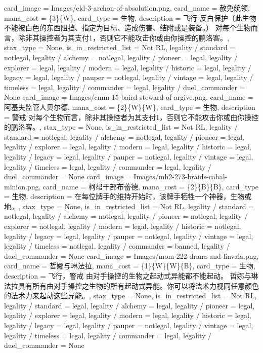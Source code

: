 \documentclass[lang = cn, color = black, 10pt]{AllThatStax}
\begin{document}
\card
{
	card_image = Images/eld-3-archon-of-absolution.png,
	card_name = 赦免统领,
	mana_cost = \{3\}\{W\},
	card_type = 生物,
	description = 飞行
	反白保护（此生物不能被白色的东西阻挡、指定为目标、造成伤害、结附或是装备。）
	对每个生物而言，除非其操控者为其支付{1}，否则它不能攻击你或由你操控的鹏洛客。,
	stax_type = None,
	is_in_restricted_list = Not RL,
	legality / standard = notlegal,
	legality / alchemy = notlegal,
	legality / pioneer = legal,
	legality / explorer = legal,
	legality / modern = legal,
	legality / historic = legal,
	legality / legacy = legal,
	legality / pauper = notlegal,
	legality / vintage = legal,
	legality / timeless = legal,
	legality / commander = legal,
	legality / duel_commander = None
}
\card
{
	card_image = Images/cmm-15-baird-steward-of-argive.png,
	card_name = 阿基夫监管人贝尔德,
	mana_cost = \{2\}\{W\}\{W\},
	card_type = 生物,
	description = 警戒
	对每个生物而言，除非其操控者为其支付{1}，否则它不能攻击你或由你操控的鹏洛客。,
	stax_type = None,
	is_in_restricted_list = Not RL,
	legality / standard = notlegal,
	legality / alchemy = notlegal,
	legality / pioneer = legal,
	legality / explorer = legal,
	legality / modern = legal,
	legality / historic = legal,
	legality / legacy = legal,
	legality / pauper = notlegal,
	legality / vintage = legal,
	legality / timeless = legal,
	legality / commander = legal,
	legality / duel_commander = None
}
\card
{
	card_image = Images/mh2-273-braids-cabal-minion.png,
	card_name = 柯帮干部布蕾德,
	mana_cost = \{2\}\{B\}\{B\},
	card_type = 生物,
	description = 在每位牌手的维持开始时，该牌手牺牲一个神器，生物或地。,
	stax_type = None,
	is_in_restricted_list = Not RL,
	legality / standard = notlegal,
	legality / alchemy = notlegal,
	legality / pioneer = notlegal,
	legality / explorer = notlegal,
	legality / modern = legal,
	legality / historic = notlegal,
	legality / legacy = legal,
	legality / pauper = notlegal,
	legality / vintage = legal,
	legality / timeless = notlegal,
	legality / commander = banned,
	legality / duel_commander = None
}
\card
{
	card_image = Images/mom-222-drana-and-linvala.png,
	card_name = 哲娜与琳法拉,
	mana_cost = \{1\}\{W\}\{W\}\{B\},
	card_type = 生物,
	description = 飞行，警戒
	由对手操控的生物之起动式异能都不能起动。
	哲娜与琳法拉具有所有由对手操控之生物的所有起动式异能。你可以将法术力视同任意颜色的法术力来起动这些异能。,
	stax_type = None,
	is_in_restricted_list = Not RL,
	legality / standard = legal,
	legality / alchemy = legal,
	legality / pioneer = legal,
	legality / explorer = legal,
	legality / modern = legal,
	legality / historic = legal,
	legality / legacy = legal,
	legality / pauper = notlegal,
	legality / vintage = legal,
	legality / timeless = legal,
	legality / commander = legal,
	legality / duel_commander = None
}
\end{document}
